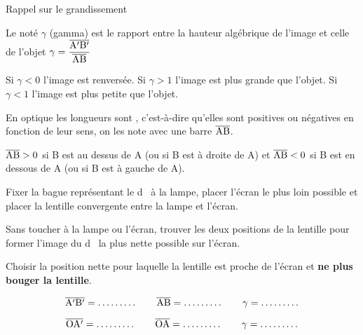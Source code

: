 \begin{doc}{Rappel sur le grandissement}
  \label{doc:grandissement}
  \vspace*{-24pt}
  \begin{encart}
    Le  noté $\gamma$ (gamma) est le rapport entre la hauteur algébrique de l'image et celle de l'objet
    $\gamma = \displaystyle \frac{\overline{\mathrm{A'B'}}}{\overline{\mathrm{AB}}}$
  \end{encart}
  Si $\gamma < 0$ l'image est renversée.
  Si $\gamma > 1$ l'image est plus grande que l'objet. 
  Si $\gamma < 1$ l'image est plus petite que l'objet.
  
  \begin{encart}
    En optique les longueurs sont , c'est-à-dire qu'elles sont positives ou négatives en fonction de leur sens, on les note avec une barre $\overline{\mathrm{AB}}$.
  \end{encart}
  \exemple $\overline{\mathrm{AB}} > 0$ si B est au dessus de A (ou si B est à droite de A) et $\overline{\mathrm{AB}} < 0$ si B est en dessous de A (ou si B est à gauche de A).
\end{doc}
\bigskip


\mesure
Fixer la bague représentant le \og d \fg\, à la lampe, placer l’écran le plus loin possible et placer la lentille convergente entre la lampe et l’écran.

Sans toucher à la lampe ou l'écran, trouver les deux positions de la lentille pour former l’image du \og d \fg\, la plus nette possible sur l’écran.
  
Choisir la position nette pour laquelle la lentille est proche de l’écran et \textbf{ne plus bouger la lentille}.

\vspace*{-8pt}
\begin{equation*}
  \algebrique{A'B'} = \ldots \ldots \ldots
  \qq{}
  \algebrique{AB} = \ldots \ldots \ldots
  \qq{}
  \gamma = \ldots \ldots \ldots
\end{equation*}


\vspace*{-8pt}
\begin{equation*}
  \algebrique{OA'} = \ldots \ldots \ldots
  \qq{}
  \algebrique{OA} = \ldots \ldots \ldots
  \qq{}
  \gamma = \ldots \ldots \ldots
\end{equation*}

